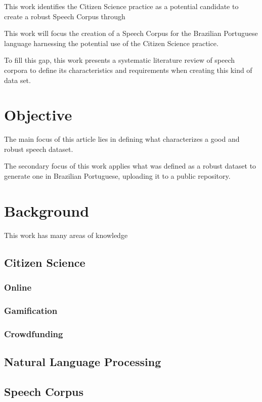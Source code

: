 This work identifies the Citizen Science practice as a potential candidate to create a robust Speech Corpus through 

This work will focus the creation of a Speech Corpus for the Brazilian Portuguese language harnessing the potential use of the Citizen Science practice.

To fill this gap, this work presents a systematic literature review of speech corpora to define its characteristics and requirements when creating this kind of data set.

\chapter{Objective}

The main focus of this article lies in defining what characterizes a good and robust speech dataset.

The secondary focus of this work applies what was defined as a robust dataset to generate one in Brazilian Portuguese, uploading it to a public repository. 

\chapter{Background}

This work has many areas of knowledge

\section{Citizen Science}

\subsection{Online}
\subsection{Gamification}
\subsection{Crowdfunding}

\section{Natural Language Processing}

\subsection{}

\section{Speech Corpus}
